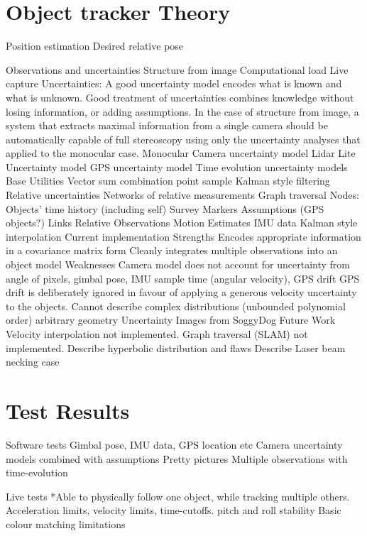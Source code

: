 \documentclass[a4paper, 11pt, titlepage]{article}
\begin{document}
\section{Object tracker Theory}
	Position estimation
	Desired relative pose

	Observations and uncertainties
		Structure from image
			Computational load
			Live capture
		Uncertainties:
			A good uncertainty model encodes what is known and what is unknown.
			Good treatment of uncertainties combines knowledge without losing information, or adding assumptions.
			In the case of structure from image, a system that extracts maximal information from a single camera should be automatically capable of full stereoscopy using only the uncertainty analyses that applied to the monocular case.
				Monocular Camera uncertainty model
				Lidar Lite Uncertainty model
				GPS uncertainty model
				Time evolution uncertainty models
				Base Utilities
					Vector sum
					combination
					point sample
				Kalman style filtering
			Relative uncertainties
				Networks of relative measurements
				Graph traversal
					Nodes:
						Objects' time history (including self)
							Survey Markers
						Assumptions (GPS objects?)
					Links
						Relative Observations
						Motion Estimates
							IMU data
							Kalman style interpolation
	Current implementation
		Strengths
			Encodes appropriate information in a covariance matrix form
			Cleanly integrates multiple observations into an object model
		Weaknesses
			Camera model does not account for uncertainty from angle of pixels, gimbal pose, IMU sample time (angular velocity), GPS drift
			GPS drift is deliberately ignored in favour of applying a generous velocity uncertainty to the objects.
			Cannot describe complex distributions (unbounded polynomial order)
				arbitrary geometry Uncertainty Images from SoggyDog
	Future Work
			Velocity interpolation not implemented.
			Graph traversal (SLAM) not implemented.
			Describe hyperbolic distribution and flaws
			Describe Laser beam necking case


\section{Test Results}

	Software tests
		Gimbal pose, IMU data, GPS location etc
		Camera uncertainty models combined with assumptions
		Pretty pictures
			Multiple observations with time-evolution

	Live tests
		*Able to physically follow one object, while tracking multiple others.
		Acceleration limits, velocity limits, time-cutoffs.
		pitch and roll stability
		Basic colour matching limitations
\end{document}

